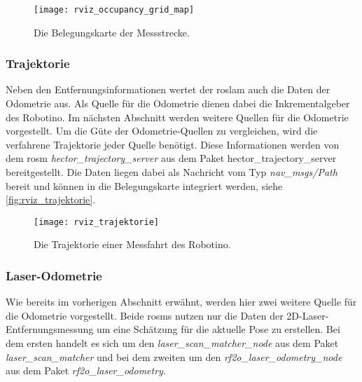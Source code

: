 \begin{figure}[h]
	\centering
	\texttt{[image: rviz\_occupancy\_grid\_map]}
	\caption{Die Belegungskarte der Messstrecke.}
	\label{fig:rviz_occupancy_grid_map}
\end{figure}
 

\begin{comment}
--------------------------------------------------------------------------------
- \url{http://wiki.ros.org/hector_trajectory_server}
- \url{http://docs.ros.org/api/nav_msgs/html/msg/Path.html}
\end{comment}
\subsubsection{Trajektorie}

Neben den Entfernungsinformationen wertet der \Gls{roslam} auch die Daten der Odometrie aus. Als Quelle für die Odometrie dienen dabei die Inkrementalgeber des Robotino. Im nächsten Abschnitt werden weitere Quellen für die Odometrie vorgestellt. Um die Güte der Odometrie-Quellen zu vergleichen, wird die verfahrene Trajektorie jeder Quelle benötigt. Diese Informationen werden von dem \Gls{rosm} \textit{hector\_trajectory\_server} aus dem Paket {hector\_trajectory\_server} bereitgestellt. Die Daten liegen dabei als Nachricht vom Typ \textit{nav\_msgs/Path} bereit und können in die Belegungskarte integriert werden, siehe \autoref{fig:rviz_trajektorie}.

\begin{figure}[h]
	\centering
	\texttt{[image: rviz\_trajektorie]}
	\caption{Die Trajektorie einer Messfahrt des Robotino.}
	\label{fig:rviz_trajektorie}
\end{figure}


\begin{comment}
--------------------------------------------------------------------------------
- \url{http://wiki.ros.org/rf2o}
- \url{http://wiki.ros.org/laser_scan_matcher}
\end{comment}
\subsubsection{Laser-Odometrie}

Wie bereits im vorherigen Abschnitt erwähnt, werden hier zwei weitere Quelle für die Odometrie vorgestellt. Beide \Glspl{rosm} nutzen nur die Daten der 2D-Laser-Entfernungsmessung um eine Schätzung für die aktuelle Pose zu erstellen. Bei dem ersten handelt es sich um den \textit{laser\_scan\_matcher\_node} aus dem Paket \textit{laser\_scan\_matcher} und bei dem zweiten um den \textit{rf2o\_laser\_odometry\_node} aus dem Paket \textit{rf2o\_laser\_odometry}.


